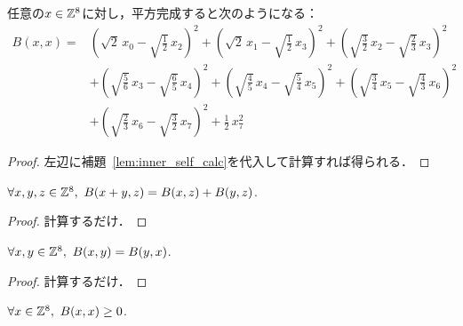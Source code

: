 \begin{lemma}
  \label{lem:inner_self_comp_sq}
  \leanok
  任意の$x \in \mathbb{Z}^8$に対し，平方完成すると次のようになる：
  \begin{equation}
    \begin{split}
      B(x, x) ={}& \left( \sqrt{2} \, x_0 - \sqrt{\frac{1}{2}} \, x_2 \right)^2 + \left( \sqrt{2} \, x_1 - \sqrt{\frac{1}{2}} \, x_3 \right)^2 + \left( \sqrt{\frac{3}{2}} \, x_2 - \sqrt{\frac{2}{3}} \, x_3 \right)^2 \\
      & + \left( \sqrt{\frac{5}{6}} \, x_3 - \sqrt{\frac{6}{5}} \, x_4 \right)^2 + \left( \sqrt{\frac{4}{5}} \, x_4 - \sqrt{\frac{5}{4}} \, x_5 \right)^2 + \left( \sqrt{\frac{3}{4}} \, x_5 - \sqrt{\frac{4}{3}} \, x_6 \right)^2 \\
      & + \left( \sqrt{\frac{2}{3}} \, x_6 - \sqrt{\frac{3}{2}} \, x_7 \right)^2 + \frac{1}{2} \, x_7^2
    \end{split}
  \end{equation}
\end{lemma}

\begin{proof}
  \leanok
  左辺に補題~\ref{lem:inner_self_calc}を代入して計算すれば得られる．
\end{proof}

\begin{theorem}
  \label{thm:add_inner}
  \leanok
  $\forall x, y, z \in \mathbb{Z}^8,\ B(x+y, z) = B(x, z) + B(y, z)$.
\end{theorem}

\begin{proof}
  \leanok
  計算するだけ．
\end{proof}

\begin{theorem}
  \label{thm:inner_sym}
  \leanok
  $\forall x, y \in \mathbb{Z}^8,\ B(x, y) = B(y, x)$.
\end{theorem}

\begin{proof}
  \leanok
  計算するだけ．
\end{proof}

\begin{theorem}
  \label{thm:inner_self}
  \leanok
  $\forall x \in \mathbb{Z}^8,\ B(x, x) \ge 0$.
\end{theorem}

